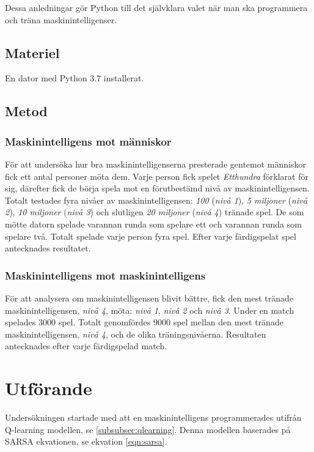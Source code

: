 \documentclass[12pt,a4paper]{article}
\begin{document}
      Dessa anledningar gör Python till det självklara valet när man ska programmera och träna maskinintelligenser.
    
    \subsection{Materiel}\label{subsec:materiel} 
      En dator med Python 3.7 installerat.
    
    \subsection{Metod}\label{subsec:metod}
      \subsubsection{Maskinintelligens mot människor}\label{subsubsec:maskinintelligensmotmanniskor} 
        För att undersöka hur bra maskinintelligenserna presterade gentemot människor fick ett antal personer möta dem. Varje person fick spelet \emph{Etthundra} förklarat för sig, därefter fick de börja spela mot en förutbestämd nivå av maskinintelligensen. Totalt testades fyra nivåer av maskinintelligensen: \emph{100} (\emph{nivå 1}), \emph{5 miljoner} (\emph{nivå 2}), \emph{10 miljoner} (\emph{nivå 3}) och slutligen \emph{20 miljoner} (\emph{nivå 4}) tränade spel. De som mötte datorn spelade varannan runda som spelare ett och varannan runda som spelare två. Totalt spelade varje person fyra spel. Efter varje färdigspelat spel antecknades resultatet.

      \subsubsection{Maskinintelligens mot maskinintelligens}\label{subsubsec:maskinintelligensmotmaskinintelligens} 
        För att analysera om maskinintelligensen blivit bättre, fick den mest tränade maskinintelligensen, \emph{nivå 4}, möta: \emph{nivå 1}, \emph{nivå 2} och \emph{nivå 3}. Under en match spelades 3000 spel. Totalt genomfördes 9000 spel mellan den mest tränade maskinintelligensen, \emph{nivå 4}, och de olika träningsnivåerna. Resultaten antecknades efter varje färdigspelad match.

  \section{Utförande}\label{sec:utforande} 
    Undersökningen startade med att en maskinintelligens programmerades utifrån Q-learning modellen, se \ref{subsubsec:qlearning}. Denna modellen baserades på SARSA ekvationen, se ekvation \ref{eqn:sarsa}.
    
\end{document}
